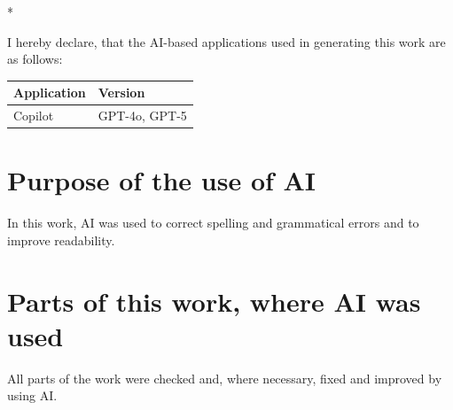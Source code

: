 \begin{aidisclaimer} * %

I hereby declare, that the AI-based applications used in generating this work are as follows:
\begin{center}
    \begin{tabularx}{\linewidth}{X|l}
        \toprule
        \textbf{Application} & \textbf{Version} \\
        \midrule
        Copilot & GPT-4o, GPT-5 \\
        \bottomrule
    \end{tabularx}
\end{center}

\section*{Purpose of the use of AI}
In this work, AI was used to correct spelling and grammatical errors and to improve readability.

\section*{Parts of this work, where AI was used}
All parts of the work were checked and, where necessary, fixed and improved by using AI.

\end{aidisclaimer}
